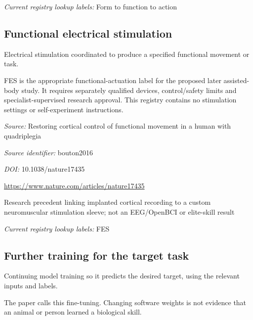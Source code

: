 \noindent\textit{Current registry lookup labels:} Form to function to action\par

\begin{samepage}
\subsection*{Functional electrical stimulation}
\noindent Electrical stimulation coordinated to produce a specified functional movement or task.\par
\end{samepage}
\noindent FES is the appropriate functional-actuation label for the proposed later assisted-body study. It requires separately qualified devices, control/safety limits and specialist-supervised research approval. This registry contains no stimulation settings or self-experiment instructions.\par



\noindent\textit{Source:} Restoring cortical control of functional movement in a human with quadriplegia\par
\noindent\textit{Source identifier:} bouton2016\par
\noindent\textit{DOI:} 10.1038/nature17435\par
\noindent\url{https://www.nature.com/articles/nature17435}\par
\noindent Research precedent linking implanted cortical recording to a custom neuromuscular stimulation sleeve; not an EEG/OpenBCI or elite-skill result\par


\noindent\textit{Current registry lookup labels:} FES\par

\begin{samepage}
\subsection*{Further training for the target task}
\noindent Continuing model training so it predicts the desired target, using the relevant inputs and labels.\par
\end{samepage}
\begin{samepage}
\noindent The paper calls this fine-tuning. Changing software weights is not evidence that an animal or person learned a biological skill.\par\nopagebreak[4]

\end{samepage}



